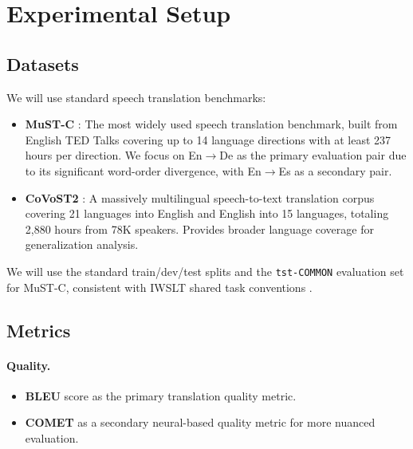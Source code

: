 \section{Experimental Setup}

\subsection{Datasets}

We will use standard speech translation benchmarks:

\begin{itemize}[leftmargin=*, itemsep=4pt]
    \item \textbf{MuST-C} \citep{digangi2019mustc, cattoni2021mustc}: The most widely used speech translation benchmark, built from English TED Talks covering up to 14 language directions with at least 237 hours per direction. We focus on En$\rightarrow$De as the primary evaluation pair due to its significant word-order divergence, with En$\rightarrow$Es as a secondary pair.

    \item \textbf{CoVoST2} \citep{wang2021covost2}: A massively multilingual speech-to-text translation corpus covering 21 languages into English and English into 15 languages, totaling 2,880 hours from 78K speakers. Provides broader language coverage for generalization analysis.
\end{itemize}

We will use the standard train/dev/test splits and the \texttt{tst-COMMON} evaluation set for MuST-C, consistent with IWSLT shared task conventions \citep{ahmad2024iwslt}.

\subsection{Metrics}

\paragraph{Quality.}
\begin{itemize}[leftmargin=*, itemsep=2pt]
    \item \textbf{BLEU} score \citep{papineni2002bleu} as the primary translation quality metric.
    \item \textbf{COMET} \citep{rei2020comet} as a secondary neural-based quality metric for more nuanced evaluation.
\end{itemize}

